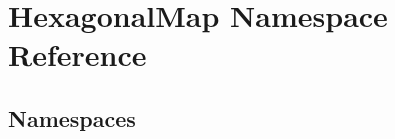 \hypertarget{namespace_hexagonal_map}{}\section{Hexagonal\+Map Namespace Reference}
\label{namespace_hexagonal_map}
\subsection*{Namespaces}
\begin{DoxyCompactItemize}
\end{DoxyCompactItemize}
